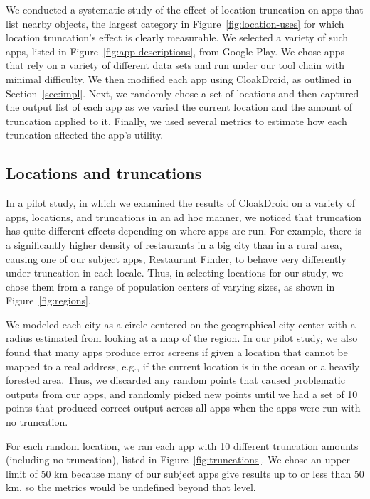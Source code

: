 \documentclass[10pt, conference, compsocconf]{IEEEtran}
\newcommand{\fuzzer}{CloakDroid\xspace}
\begin{document}
We conducted a systematic study of the effect of location truncation
on apps that list nearby objects, the largest category in
Figure~\ref{fig:location-uses} for which location truncation's effect is clearly
measurable. We selected a variety of such apps, listed in
Figure~\ref{fig:app-descriptions}, from Google Play. We chose apps
that rely on a variety of different data sets and run under our tool
chain with minimal difficulty.
We then modified each app using \fuzzer, as outlined
in Section~\ref{sec:impl}. Next, we randomly chose a set of locations and
then captured the output list of each app as we varied the current
location and the amount of truncation applied to it. Finally, we used
several metrics to estimate how each truncation affected the app's
utility.

\subsection{Locations and truncations}

In a pilot study, in which we examined the results of \fuzzer{} on a
variety of apps, locations, and truncations in an ad hoc manner,
we noticed that truncation has quite different
effects depending on where apps are
run. For example, there is a significantly higher density of restaurants in
a big city than in a rural area, causing one of our subject apps,
Restaurant Finder, to behave very differently under truncation in each locale.
Thus, in selecting locations for
our study, we chose them from a range of population centers of varying
sizes, as shown in Figure~\ref{fig:regions}. 

We modeled each city as a circle centered on the geographical 
city center with a radius estimated
from looking at a map of the region. In
our pilot study, we also found that many apps produce error screens if
given a location that cannot be mapped to a real address, e.g., if the
current location is in the ocean or a heavily forested area.
Thus, we discarded any random points that caused 
problematic outputs from our apps, and randomly picked new
points until we had a set of 10 points that produced correct output
across all apps when the apps were run with no truncation.

For each random location, we ran each app with 10 different truncation
amounts (including no truncation), listed in
Figure~\ref{fig:truncations}.  We chose an upper limit of 50 km because 
many of our subject apps
give results up to or less than 50 km, so the metrics would
be undefined beyond that level.
\end{document}
